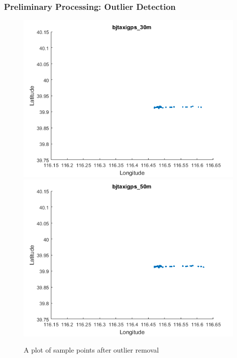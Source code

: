 \documentclass{beamer}
\theoremstyle{definition}
\begin{document}
\begin{frame}
\frametitle{Preliminary Processing: Outlier Detection}

\begin{figure}[h!]
\includegraphics[width = 0.5\linewidth]{bjtaxigps_30m} 
\includegraphics[width = 0.5\linewidth]{bjtaxigps_50m} 
\caption{A plot of sample points after outlier removal}\label{Fig:after_removal}
\end{figure}
\end{frame}
%
%
\end{document}
